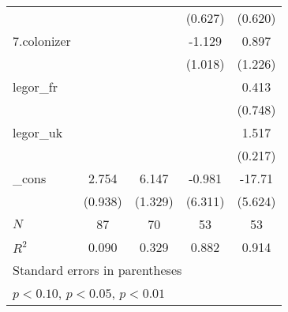{\begin{tabular}{l*{4}{c}}
            &                     &                     &     (0.627)         &     (0.620)         \\
[1em]
7.colonizer &                     &                     &      -1.129         &       0.897         \\
            &                     &                     &     (1.018)         &     (1.226)         \\
[1em]
legor\_fr    &                     &                     &                     &       0.413         \\
            &                     &                     &                     &     (0.748)         \\
[1em]
legor\_uk    &                     &                     &                     &       1.517\sym{***}\\
            &                     &                     &                     &     (0.217)         \\
[1em]
\_cons      &       2.754\sym{**} &       6.147\sym{***}&      -0.981         &      -17.71\sym{**} \\
            &     (0.938)         &     (1.329)         &     (6.311)         &     (5.624)         \\
\hline
\(N\)       &          87         &          70         &          53         &          53         \\
\(R^{2}\)   &       0.090         &       0.329         &       0.882         &       0.914         \\
\hline\hline
\multicolumn{5}{l}{\footnotesize Standard errors in parentheses}\\
\multicolumn{5}{l}{\footnotesize \sym{*} \(p<0.10\), \sym{**} \(p<0.05\), \sym{***} \(p<0.01\)}\\
\end{tabular}
}
